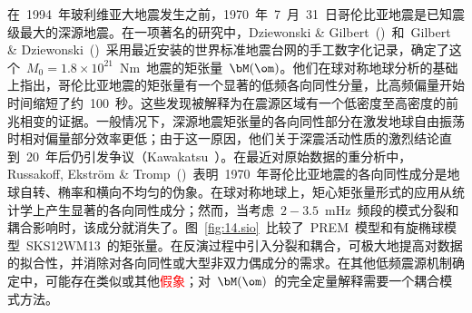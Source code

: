 在~1994~年玻利维亚大地震发生之前，1970~年~7~月~31~日哥伦比亚地震是已知震级最大的深源地震。在一项著名的研究中，Dziewonski \& Gilbert~(\citeyear{dziewonski&gilbert74})~和~Gilbert \& Dziewonski~(\citeyear{gilbert&dziewonski75})~采用最近安装的世界标准地震台网的手工数字化记录，确定了这个~$M_0=1.8\times 10^{21}$~N\hspace{0.6 mm}m~地震的矩张量~$\bM(\om)$。他们在球对称地球分析的基础上指出，哥伦比亚地震的矩张量有一个显著的低频各向同性分量，比高频偏量开始时间缩短了约~100~秒。这些发现被解释为在震源区域有一个低密度至高密度的前兆相变的证据。一般情况下，深源地震矩张量的各向同性部分在激发地球自由振荡时相对偏量部分效率更低；由于这一原因，他们关于深震活动性质的激烈结论直到~20~年后仍引发争议（Kawakatsu~\citeyear{kawakatsu96}）。在最近对原始数据的重分析中，Russakoff, Ekstr\"{o}m \& Tromp~(\citeyear{russakoff&al97})~表明~1970~年哥伦比亚地震的各向同性成分是地球自转、椭率和横向不均匀的伪象。在球对称地球上，矩心矩张量形式的应用从统计学上产生显著的各向同性成分；然而，当考虑~$2\!-\!3.5$~mHz~频段的模式分裂和耦合影响时，该成分就消失了。图~\ref{fig:14.sio}~比较了~PREM~模型和有旋椭球模型~SKS12WM13~的矩张量。在反演过程中引入分裂和耦合，可极大地提高对数据的拟合性，并消除对各向同性或大型非双力偶成分的需求。在其他低频震源机制确定中，可能存在类似或其他\textcolor{red}{假象}；对~$\bM(\om)$~的完全定量解释需要一个耦合模式方法。

